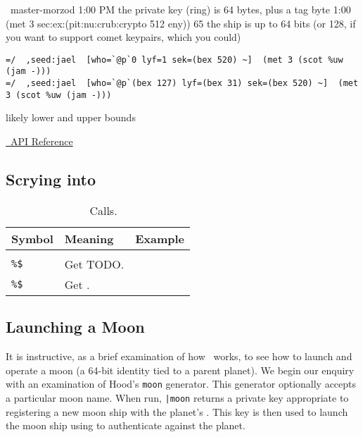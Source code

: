 ~master-morzod
1:00 PM
the private key (ring) is 64 bytes, plus a tag byte
1:00
(met 3 sec:ex:(pit:nu:crub:crypto 512 eny))
65
the ship is up to 64 bits (or 128, if you want to support comet keypairs, which you could)
\begin{lstlisting}
=/  ,seed:jael  [who=`@p`0 lyf=1 sek=(bex 520) ~]  (met 3 (scot %uw (jam -)))
=/  ,seed:jael  [who=`@p`(bex 127) lyf=(bex 31) sek=(bex 520) ~]  (met 3 (scot %uw (jam -)))
\end{lstlisting}
likely lower and upper bounds


\href{https://urbit.org/docs/arvo/jael/jael-api/}{\jael~API Reference}



\subsection{Scrying into \jael}





\begin{table}[h!]
  \begin{center}
    \caption{\jael~\dotket~Calls.}
    \label{ha:jael}
    \begin{tabular}{lll}
      Symbol & Meaning & Example \\
      \hline \\
      \texttt{\%\$} & Get TODO. & \\
      \texttt{\%\$} & Get . & \\
    \end{tabular}
  \end{center}
\end{table}


\subsection{Launching a Moon}

It is instructive, as a brief examination of how \jael~works, to see how to launch and operate a moon (a 64-bit identity tied to a parent planet).  We begin our enquiry with an examination of Hood's \texttt{moon} generator.  This generator optionally accepts a particular moon name.  When run, \texttt{|moon} returns a private key appropriate to registering a new moon ship with the planet's \jael.  This key is then used to launch the moon ship using \jael to authenticate against the planet.

